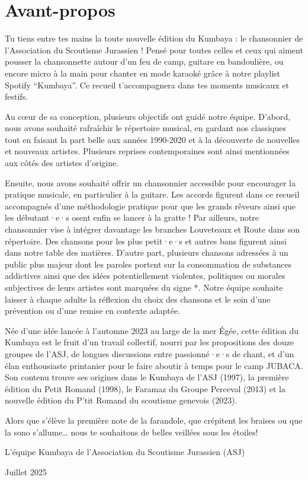 \section*{Avant-propos}
\small Tu tiens entre tes mains la toute nouvelle édition du Kumbaya : le chansonnier de l'Association du Scoutisme Jurassien ! Pensé pour toutes celles et ceux qui aiment pousser la chansonnette autour d'un feu de camp, guitare en bandoulière, ou encore micro à la main pour chanter en mode karaoké grâce à notre playlist Spotify “Kumbaya”. Ce recueil t'accompagnera dans tes moments musicaux et festifs.

Au cœur de sa conception, plusieurs objectifs ont guidé notre équipe. D'abord, nous avons souhaité rafraîchir le répertoire musical, en gardant nos classiques tout en faisant la part belle aux années 1990-2020 et à la découverte de nouvelles et nouveaux artistes. Plusieurs reprises contemporaines sont ainsi mentionnées aux côtés des artistes d'origine.

Ensuite, nous avons souhaité offrir un chansonnier accessible pour encourager la pratique musicale, en particulier à la guitare. Les accords figurent dans ce recueil accompagnés d'une méthodologie pratique pour que les grands rêveurs ainsi que les débutant·e·s osent enfin se lancer à la gratte !
Par ailleurs, notre chansonnier vise à intégrer davantage les branches Louveteaux et Route dans son répertoire. Des chansons pour les plus petit·e·s et autres bans figurent ainsi dans notre table des matières. D'autre part, plusieurs chansons adressées à un public plus majeur dont les paroles portent sur la consommation de substances addictives ainsi que des idées potentiellement violentes, politiques ou morales subjectives de leurs artistes sont marquées du signe *. Notre équipe souhaite laisser à chaque adulte la réflexion du choix des chansons et le soin d'une prévention ou d'une remise en contexte adaptée.

Née d'une idée lancée à l'automne 2023 au large de la mer Égée, cette édition du Kumbaya est le fruit d'un travail collectif, nourri par les propositions des douze groupes de l'ASJ, de longues discussions entre passionné·e·s de chant, et d'un élan enthousiaste printanier pour le faire aboutir à temps pour le camp JUBACA. Son contenu trouve ses origines dans le Kumbaya de l'ASJ (1997), la première édition du Petit Romand (1998), le Faramaz du Groupe Perceval (2013) et la nouvelle édition du P'tit Romand du scoutisme genevois (2023).

Alors que s'élève la première note de la farandole, que crépitent les braises ou que la sono s'allume… nous te souhaitons de belles veillées sous les étoiles!

L'équipe Kumbaya de l'Association du Scoutisme Jurassien (ASJ)

Juillet 2025
